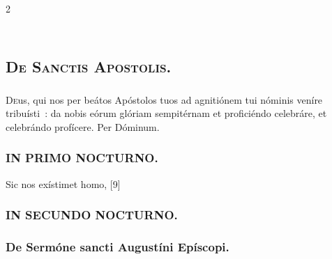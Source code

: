 \documentclass[9pt,twoside]{extarticle}
\begin{document}
\begin{multicols}{2}
{{\subsection*{\center {}}
\subsection*{\center \textsc{\\ De Sanctis Apostolis.}}
\subsubsection*{\center {}}

\begin{tightlist}{}
\item {}
\end{tightlist}

\subsubsection*{\center {}}
\lettrine{D}eus, qui nos per beátos Apóstolos tuos ad agnitiónem tui nóminis veníre tribuísti~: da nobis eórum glóriam sempitérnam et proficiéndo celebráre, et celebrándo profícere. Per Dóminum.

\subsubsection*{\center \textsc{IN PRIMO NOCTURNO.}}
\begin{tightlist}{}
\item {} Sic nos exístimet homo,  [9]
\end{tightlist}

\subsubsection*{\center \textsc{IN SECUNDO NOCTURNO.}}

\subsubsection*{\center De Sermóne sancti Augustíni Epíscopi.}
}}
\end{multicols}
\end{document}
